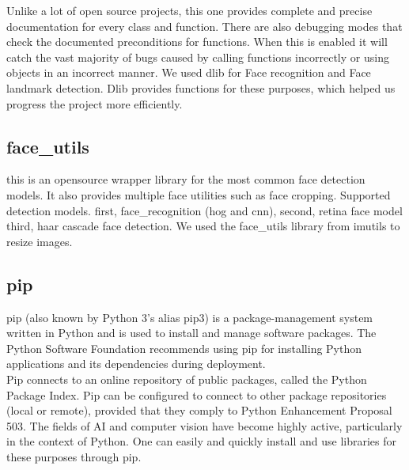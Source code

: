 Unlike a lot of open source projects, this one provides complete and precise documentation for every class and function. There are also debugging modes that check the documented preconditions for functions. When this is enabled it will catch the vast majority of bugs caused by calling functions incorrectly or using objects in an incorrect manner.
We used dlib for Face recognition and Face landmark detection. Dlib provides functions for these purposes, which helped us progress the project more efficiently.\\

\subsection{\textbf{face\_utils}}
\cite{faceutil} this is an opensource wrapper library for the most common face detection models.
It also provides multiple face utilities such as face cropping.
Supported detection models. first, face\_recognition (hog and cnn), second, retina face model third, haar cascade face detection. We used the face\_utils library from imutils to resize images.\\

\subsection{\textbf{pip}}
\cite{pip} pip (also known by Python 3's alias pip3) is a package-management system written in Python and is used to install and manage software packages. The Python Software Foundation recommends using pip for installing Python applications and its dependencies during deployment.\\
Pip connects to an online repository of public packages, called the Python Package Index. Pip can be configured to connect to other package repositories (local or remote), provided that they comply to Python Enhancement Proposal 503. The fields of AI and computer vision have become highly active, particularly in the context of Python. One can easily and quickly install and use libraries for these purposes through pip.\\

